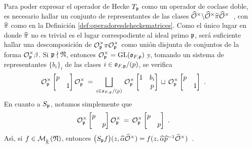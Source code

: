 Para poder expresar el operador de Hecke $T_{\frak{p}}$ como un operador de
coclase doble, es necesario hallar un conjunto de representantes de las clases
\begin{math}
	\Idfin{\cal{O}}\backslash\Idfin{\cal{O}}\hhat{\pi}\Idfin{\cal{O}}
\end{math}~,
con $\hhat{\pi}$ como en la Definici\'{o}n \ref{def:operadoresdeheckematrices}.
Como el \'{u}nico lugar en donde $\hhat{\pi}$ no es trivial es el lugar
correspodiente al ideal primo $\frak{p}$, ser\'{a} suficiente hallar una
descomposici\'{o}n de
\begin{math}
	\cal{O}_{\frak{p}}^{\times}\pi\cal{O}_{\frak{p}}^{\times}
\end{math}
como uni\'{o}n disjunta de conjuntos de la forma
$\cal{O}_{\frak{p}}^{\times}\beta$. Si $\frak{p}\nmid\frak{N}$, entonces
$\cal{O}_{\frak{p}}^{\times}=\GL(\oka{F,\frak{p}})$ y, tomando un sistema de
representantes $\{b_{i}\}_{i}$ de las clases $i\in\oka{F,\frak{p}}/(p)$, se
verifica
\begin{align*}
	\cal{O}_{\frak{p}}^{\times}
		\begin{bmatrix} p & \\ & 1 \end{bmatrix}
			\cal{O}_{\frak{p}}^{\times} & \,=\,
		\bigsqcup_{i\in\oka{F,\frak{p}}/(p)}\,
			\cal{O}_{\frak{p}}^{\times}
		\begin{bmatrix} 1 & b_{i} \\ & p \end{bmatrix}\,\sqcup\,
			\cal{O}_{\frak{p}}^{\times}
		\begin{bmatrix} p & \\ & 1\end{bmatrix}
	\text{ .}
\end{align*}
%
En cuanto a $S_{\frak{p}}$, notamos simplemente que
\begin{align*}
	\cal{O}_{\frak{p}}^{\times}
		\begin{bmatrix} p & \\ & p \end{bmatrix}
			\cal{O}_{\frak{p}}^{\times} & \,=\,
		\cal{O}_{\frak{p}}^{\times}
			\begin{bmatrix} p & \\ & p \end{bmatrix}
	\text{ .}
\end{align*}
%
As\'{\i}, si $f\in\modularH{k}{\frak{N}}$, entonces
\begin{math}
	\big(S_{\frak{p}}f\big)(z,\hhat{\alpha}\Idfin{\cal{O}})=
		f(z,\hhat{\alpha}\hhat{p}^{-1}\Idfin{\cal{O}})
\end{math}~.
